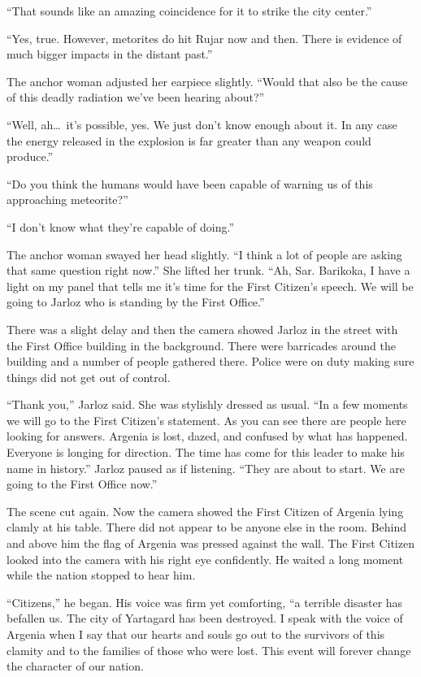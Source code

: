 ``That sounds like an amazing coincidence for it to strike the city center.''

``Yes, true. However, metorites do hit Rujar now and then. There is evidence of much bigger
impacts in the distant past.''

The anchor woman adjusted her earpiece slightly. ``Would that also be the cause of this deadly
radiation we've been hearing about?''

``Well, ah\ldots\ it's possible, yes. We just don't know enough about it. In any case the energy
released in the explosion is far greater than any weapon could produce.''

``Do you think the humans would have been capable of warning us of this approaching meteorite?''

``I don't know what they're capable of doing.''

The anchor woman swayed her head slightly. ``I think a lot of people are asking that same
question right now.'' She lifted her trunk. ``Ah, Sar. Barikoka, I have a light on my panel that
tells me it's time for the First Citizen's speech. We will be going to Jarloz who is standing by
the First Office.''

There was a slight delay and then the camera showed Jarloz in the street with the First Office
building in the background. There were barricades around the building and a number of people
gathered there. Police were on duty making sure things did not get out of control.

``Thank you,'' Jarloz said. She was stylishly dressed as usual. ``In a few moments we will go to
the First Citizen's statement. As you can see there are people here looking for answers. Argenia
is lost, dazed, and confused by what has happened. Everyone is longing for direction. The time
has come for this leader to make his name in history.'' Jarloz paused as if listening. ``They
are about to start. We are going to the First Office now.''

The scene cut again. Now the camera showed the First Citizen of Argenia lying clamly at his
table. There did not appear to be anyone else in the room. Behind and above him the flag of
Argenia was pressed against the wall. The First Citizen looked into the camera with his right
eye confidently. He waited a long moment while the nation stopped to hear him.

``Citizens,'' he began. His voice was firm yet comforting, ``a terrible disaster has befallen
us. The city of Yartagard has been destroyed. I speak with the voice of Argenia when I say that
our hearts and souls go out to the survivors of this clamity and to the families of those who
were lost. This event will forever change the character of our nation.

